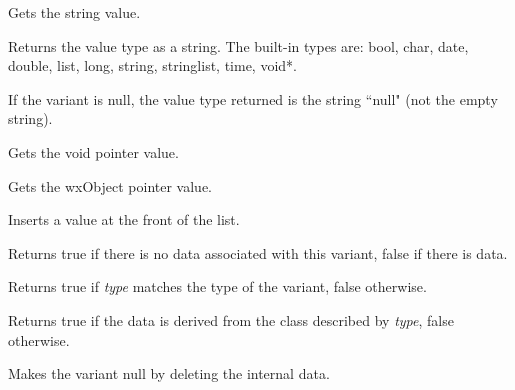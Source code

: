Gets the string value.

\label{wxvariantgettype}


Returns the value type as a string. The built-in types are: bool, char, date, double, list, long, string, stringlist, time, void*.

If the variant is null, the value type returned is the string ``null" (not the empty string).

\label{wxvariantgetvoidptr}


Gets the void pointer value.

\label{wxvariantgetwxobjectptr}


Gets the wxObject pointer value.

\label{wxvariantinsert}


Inserts a value at the front of the list.

\label{wxvariantisnull}


Returns true if there is no data associated with this variant, false if there is data.

\label{wxvariantistype}


Returns true if {\it type} matches the type of the variant, false otherwise.

\label{wxvariantisvaluekindof}


Returns true if the data is derived from the class described by {\it type}, false otherwise.

\label{wxvariantmakenull}


Makes the variant null by deleting the internal data.

\label{wxvariantmakestring}

